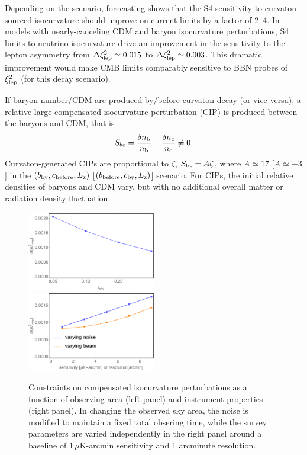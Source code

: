 Depending on the scenario, forecasting shows that the S4 sensitivity to curvaton-sourced isocurvature should improve on current limits by a factor of 2--4. In models with nearly-canceling CDM and baryon isocurvature perturbations, S4 limits to neutrino isocurvature drive an improvement in the sensitivity to the lepton asymmetry from $\Delta \xi_{\rm lep}^{2}\simeq 0.015$ to $\Delta \xi_{\rm lep}^{2}\simeq 0.003$. This dramatic improvement would make CMB limits comparably sensitive to BBN probes of $\xi_{\rm lep}^{2}$ (for this decay scenario).

If baryon number/CDM are produced by/before curvaton decay (or vice versa), a relative large compensated isocurvature perturbation (CIP) is produced between the baryons and CDM, that is
\begin{equation}
S_{bc}=\frac{\delta n_{\rm b}}{n_{\rm b}}-\frac{\delta n_{\rm c}}{n_{\rm c}}\neq 0.
\end{equation} Curvaton-generated CIPs are proportional to $\zeta$, $S_{\rm bc}=A\zeta$, where $A\simeq 17$ [$A\simeq -3$] in the $(b_{\rm by}, c_{\rm before}, L_{\rm z})$ [$(b_{\rm before}, c_{\rm by}, L_{\rm z})$] scenario. For CIPs, the initial relative densities of baryons and CDM vary, but with no additional overall matter or radiation density fluctuation.

\begin{figure}[htbp!]
\includegraphics[width=0.5\textwidth]{Inflation/S4CIPsfsky.pdf}
 \includegraphics[width=0.5\textwidth]{Inflation/S4CIPsNoise.pdf}
 \caption{Constraints on compensated isocurvature perturbations as a function of observing area (left panel) and instrument properties (right panel). In changing the observed sky area, the noise is modified to maintain a fixed total obsering time, while the survey parameters are varied independently in the right panel around a baseline of $1\,\mu$K-arcmin sensitivity and 1 arcminute resolution.
\label{fig:CIPs_kovetz}}
\end{figure} 

